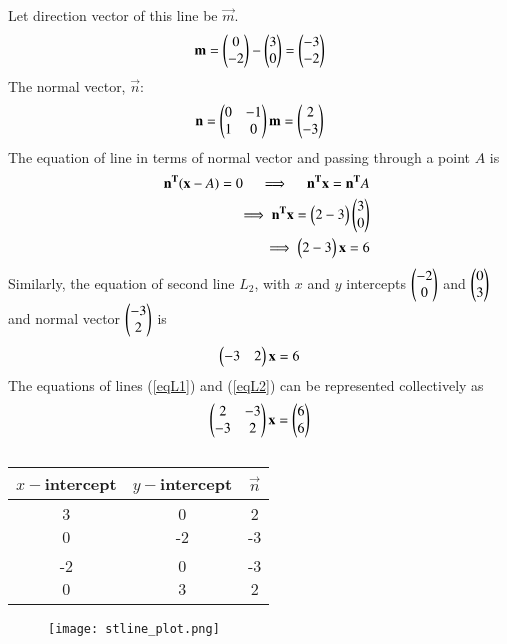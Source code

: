 \documentclass[journal,12pt,twocolumn]{IEEEtran}
\begin{document}
Let direction vector of this line be $\vec{m}$.
\begin{align}
	\mathbf{m} = \begin{pmatrix}0\\-2\end{pmatrix} - \begin{pmatrix}3\\0\end{pmatrix} = \begin{pmatrix}-3\\-2\end{pmatrix}
\end{align}
The normal vector, $\vec{n}$: 
\begin{align}
	{\mathbf{n}} = \begin{pmatrix}0 & -1 \\ 1 & 0\end{pmatrix}\mathbf{m} = \begin{pmatrix}2 \\ -3\end{pmatrix}
\end{align}
The equation of line in terms of normal vector and passing through a point $A$ 
	is
\begin{align}
	\quad \mathbf{n^T}(\mathbf{x} - A ) = 0
	\quad \implies \quad \mathbf{n^Tx} = \mathbf{n^T}A \\
	\implies \mathbf{n^Tx}= \begin{pmatrix}2 -3\end{pmatrix}\begin{pmatrix}3 \\ 0\end{pmatrix} \\
	\implies \begin{pmatrix}2 -3\end{pmatrix}\mathbf{x} = 6	\label{eqL1}
\end{align}
Similarly, the equation of second line $L_2$, with $x$ and 
	$y$ intercepts $\begin{pmatrix} -2 \\ 0\end{pmatrix}$ and $\begin{pmatrix} 0 \\ 3\end{pmatrix}$ and 
	normal vector $\begin{pmatrix} -3 \\ 2\end{pmatrix}$ is
\begin{align}
	\begin{pmatrix}-3 &  2 \end{pmatrix} {\mathbf{x}} = 6	\label{eqL2}
\end{align}
The equations of lines (\ref{eqL1}) and (\ref{eqL2}) can be represented 
	collectively as
\begin{align}
	\begin{pmatrix}2 & -3 \\ -3 & 2\end{pmatrix}\mathbf{x} = \begin{pmatrix}6 \\ 6\end{pmatrix}
\end{align}

\begin{table}[htbp]
	\centering
	\begin{tabular}{|c|c|c|} \hline 
	$x-$intercept & $y-$intercept & \quad $\vec{n}$  \\ \hline \hline
	\myvec{3\\0}	&	\myvec{0\\-2}	&	\myvec{2\\-3} \\ \hline
	\myvec{-2\\0}	&	\myvec{0\\3}	&	\myvec{-3\\2} \\ \hline
	\end{tabular}
	\caption{} \label{coeftable}
\end{table}
\begin{figure}[!h]
\texttt{[image: stline\_plot.png]}
	\caption{}  \label{linefig1} 
\end{figure}
\end{document}

